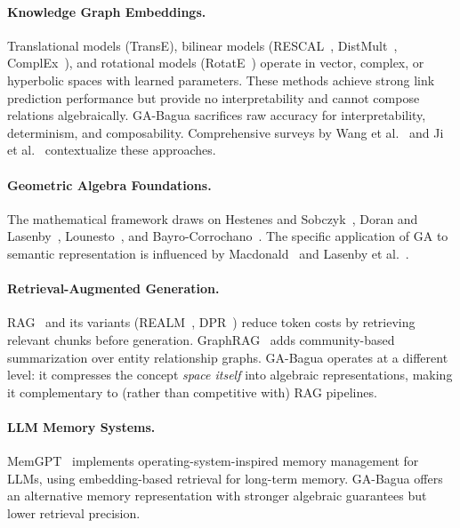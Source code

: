 \documentclass[11pt,a4paper]{article}
\begin{document}
\paragraph{Knowledge Graph Embeddings.} Translational models
(TransE), bilinear models (RESCAL~\cite{nickel2011three}, DistMult~\cite{yang2015embedding},
ComplEx~\cite{trouillon2016complex}), and rotational models
(RotatE~\cite{sun2019rotate}) operate in vector, complex, or hyperbolic spaces
with learned parameters. These methods achieve strong link prediction
performance but provide no interpretability and cannot compose relations
algebraically. GA-Bagua sacrifices raw accuracy for interpretability,
determinism, and composability. Comprehensive surveys by
Wang et al.~\cite{wang2017knowledge} and Ji et al.~\cite{ji2021survey}
contextualize these approaches.

\paragraph{Geometric Algebra Foundations.} The mathematical framework draws on
Hestenes and Sobczyk~\cite{hestenes1984clifford}, Doran and
Lasenby~\cite{doran2003geometric}, Lounesto~\cite{lounesto2001clifford}, and
Bayro-Corrochano~\cite{bayro2019geometric}. The specific application of GA to
semantic representation is influenced by
Macdonald~\cite{macdonald2010survey} and Lasenby et
al.~\cite{lasenby2003applications}.

\paragraph{Retrieval-Augmented Generation.} RAG~\cite{lewis2020rag} and its
variants (REALM~\cite{guu2020realm}, DPR~\cite{karpukhin2020dpr}) reduce
token costs by retrieving relevant chunks before generation. GraphRAG~\cite{edge2024graphrag}
adds community-based summarization over entity relationship graphs. GA-Bagua
operates at a different level: it compresses the concept \emph{space itself}
into algebraic representations, making it complementary to (rather than
competitive with) RAG pipelines.

\paragraph{LLM Memory Systems.} MemGPT~\cite{packer2024memgpt} implements
operating-system-inspired memory management for LLMs, using embedding-based
retrieval for long-term memory. GA-Bagua offers an alternative memory
representation with stronger algebraic guarantees but lower retrieval
precision.
\end{document}
